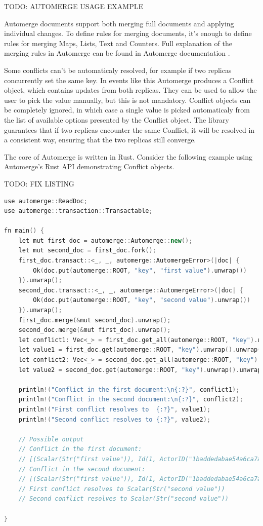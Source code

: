\documentclass[a4paper, 11pt, oneside]{article}
\theoremstyle{definition}
\begin{document}
TODO: AUTOMERGE USAGE EXAMPLE

Automerge documents support both merging full documents and applying individual changes. To define rules for merging documents, it's enough to define rules for merging Maps, Lists, Text and Counters. Full explanation of the merging rules in Automerge can be found in Automerge documentation \cite{automergerules}.

Some conflicts can't be automaticaly resolved, for example if two replicas concurrently set the same key. In events like this Automerge produces a Conflict object, which contains updates from both replicas. They can be used to allow the user to pick the value manually, but this is not mandatory. Conflict objects can be completely ignored, in which case a single value is picked automaticaly from the list of available options presented by the Conflict object. The library guarantees that if two replicas encounter the same Conflict, it will be resolved in a consistent way, ensuring that the two replicas still converge.

The core of Automerge is written in Rust. Consider the following example using Automerge's Rust API demonstrating Conflict objects.

TODO: FIX LISTING
\begin{lstlisting}[language=C++]
use automerge::ReadDoc;
use automerge::transaction::Transactable;

fn main() {
    let mut first_doc = automerge::Automerge::new();
    let mut second_doc = first_doc.fork();
    first_doc.transact::<_, _, automerge::AutomergeError>(|doc| {
        Ok(doc.put(automerge::ROOT, "key", "first value").unwrap())
    }).unwrap();
    second_doc.transact::<_, _, automerge::AutomergeError>(|doc| {
        Ok(doc.put(automerge::ROOT, "key", "second value").unwrap())
    }).unwrap();
    first_doc.merge(&mut second_doc).unwrap();
    second_doc.merge(&mut first_doc).unwrap();
    let conflict1: Vec<_> = first_doc.get_all(automerge::ROOT, "key").unwrap();
    let value1 = first_doc.get(automerge::ROOT, "key").unwrap().unwrap().0;
    let conflict2: Vec<_> = second_doc.get_all(automerge::ROOT, "key").unwrap();
    let value2 = second_doc.get(automerge::ROOT, "key").unwrap().unwrap().0;

    println!("Conflict in the first document:\n{:?}", conflict1);
    println!("Conflict in the second document:\n{:?}", conflict2);
    println!("First conflict resolves to  {:?}", value1);
    println!("Second conflict resolves to {:?}", value2);

    // Possible output
    // Conflict in the first document:
    // [(Scalar(Str("first value")), Id(1, ActorID("1baddedabae54a6ca7a8aaf03dc2a8a4"), 0)), (Scalar(Str("second value")), Id(1, ActorID("43ca89b2a9854a358c5ea75c26ae735c"), 1))]
    // Conflict in the second document:
    // [(Scalar(Str("first value")), Id(1, ActorID("1baddedabae54a6ca7a8aaf03dc2a8a4"), 1)), (Scalar(Str("second value")), Id(1, ActorID("43ca89b2a9854a358c5ea75c26ae735c"), 0))]
    // First conflict resolves to Scalar(Str("second value"))
    // Second conflict resolves to Scalar(Str("second value"))

}

\end{lstlisting}
\end{document}
